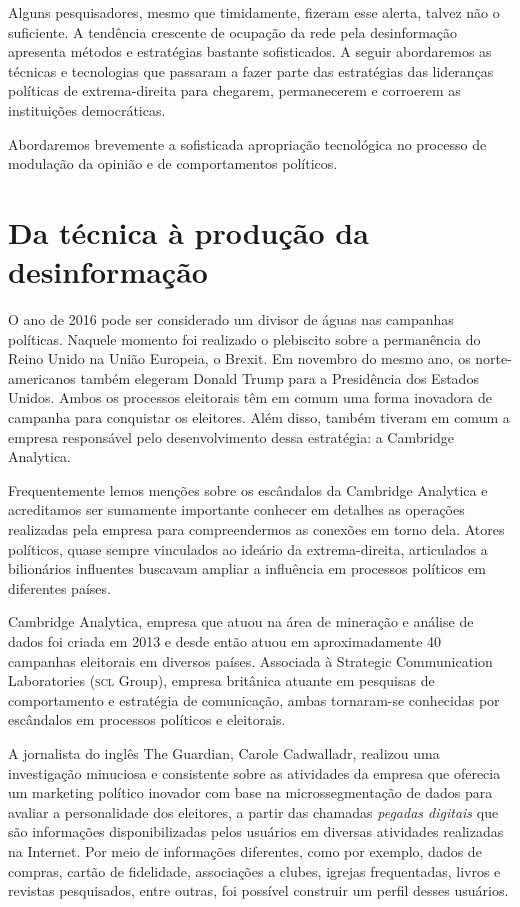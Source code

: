 Alguns pesquisadores, mesmo que timidamente, fizeram esse alerta, talvez
não o suficiente. A tendência crescente de ocupação da rede pela
desinformação apresenta métodos e estratégias bastante sofisticados. A
seguir abordaremos as técnicas e tecnologias que passaram a fazer parte
das estratégias das lideranças políticas de extrema-direita para
chegarem, permanecerem e corroerem as instituições democráticas.

Abordaremos brevemente a sofisticada apropriação tecnológica no processo
de modulação da opinião e de comportamentos políticos.

\section{Da técnica à produção da desinformação}

O ano de 2016 pode ser considerado um divisor de águas nas campanhas
políticas. Naquele momento foi realizado o plebiscito sobre a
permanência do Reino Unido na União Europeia, o Brexit. Em novembro do
mesmo ano, os norte-americanos também elegeram Donald Trump para a Presidência
dos Estados Unidos. Ambos os processos eleitorais têm em comum uma
forma inovadora de campanha para conquistar os eleitores. Além disso,
também tiveram em comum a empresa responsável pelo desenvolvimento dessa
estratégia: a Cambridge Analytica.

Frequentemente lemos menções sobre os escândalos da Cambridge Analytica
e acreditamos ser sumamente importante conhecer em detalhes as operações
realizadas pela empresa para compreendermos as conexões em torno dela.
Atores políticos, quase sempre vinculados ao ideário da extrema-direita,
articulados a bilionários influentes buscavam ampliar a influência em
processos políticos em diferentes países.

Cambridge Analytica, empresa que atuou na área de mineração e análise de
dados foi criada em 2013 e desde então atuou em aproximadamente 40
campanhas eleitorais em diversos países. Associada à Strategic
Communication Laboratories (\textsc{scl} Group), empresa britânica atuante em
pesquisas de comportamento e estratégia de comunicação, ambas tornaram-se
conhecidas por escândalos em processos políticos e eleitorais.

A jornalista do inglês The Guardian, Carole Cadwalladr, realizou
uma investigação minuciosa e consistente sobre as atividades da empresa
que oferecia um marketing político inovador com base na
microssegmentação de dados para avaliar a personalidade dos eleitores, a
partir das chamadas \textit{pegadas digitais} que são informações
disponibilizadas pelos usuários em diversas atividades realizadas na
Internet. Por meio de informações diferentes, como por exemplo, dados de
compras, cartão de fidelidade, associações a clubes, igrejas
frequentadas, livros e revistas pesquisados, entre outras, foi possível
construir um perfil desses usuários.

